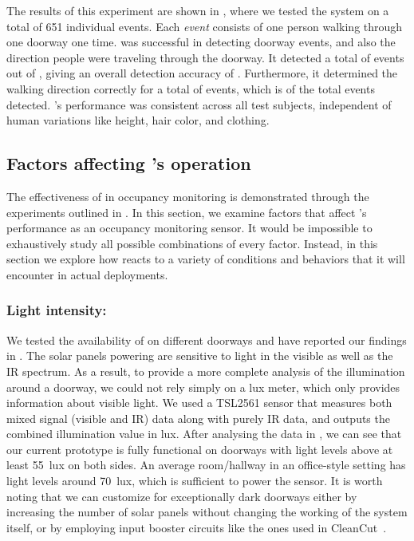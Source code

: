 The results of this experiment are shown in , where we tested the system on a total of 651 individual events.
Each \textit{event} consists of one person walking through one doorway one time.
\sysname was successful in detecting doorway events, and also the direction people were traveling through the doorway.
It detected a total of \numDet events out of \numExp, giving an overall detection accuracy of \SysAccuracy.
Furthermore, it determined the walking direction correctly for a total of \numDir events, which is \dirAccuracy of the total events detected.
\sysname's performance was consistent across all test subjects, independent of human variations like height, hair color, and clothing.


\subsection{Factors affecting \sysname's operation}

The effectiveness of \sysname in occupancy monitoring is demonstrated through the experiments outlined in .
In this section, we examine factors that affect \sysname's performance as an occupancy monitoring sensor.
It would be impossible to exhaustively study all possible combinations of every factor.
Instead, in this section we explore how \sysname reacts to a variety of conditions and behaviors that it will encounter in actual deployments.


\subsubsection{Light intensity:}
We tested the availability of \sysname on different doorways and have reported our findings in .
The solar panels powering \sysname are sensitive to light in the visible as well as the IR spectrum.
As a result, to provide a more complete analysis of the illumination around a doorway, we could not rely simply on a lux meter, which only provides information about visible light.
We used a TSL2561 sensor that measures both mixed signal (visible and IR) data along with purely IR data, and outputs the combined illumination value in lux.
After analysing the data in , we can see that our current prototype is fully functional on doorways with light levels above at least 55~lux on both sides.
An average room/hallway in an office-style setting has light levels around 70~lux, which is sufficient to power the \sysname sensor.
It is worth noting that we can customize \sysname for exceptionally dark doorways either by increasing the number of solar panels without changing the working of the system itself, or by employing input booster circuits like the ones used in CleanCut~\cite{colin2018cleancut}.

